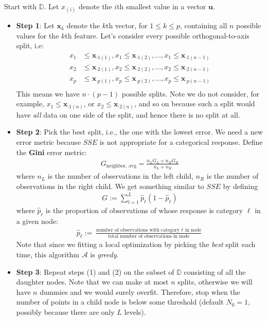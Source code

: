 \documentclass[12pt]{article}
\begin{document}
\begin{enumerate}
Start with $\mathbb{D}$. Let $x_{(i)}$ denote the $i$th smallest
value in a vector $\bm{u}$.
\begin{itemize}
	\item \textbf{Step 1}: Let $\bm{x}_k$ denote the $k$th vector, for $1\leq k\leq p$,
	containing all $n$ possible values for the $k$th feature.
	Let's consider every possible orthogonal-to-axis split, i.e:
	\begin{align*}
		x_1&\leq \bm{x}_{\cdot 1(1)}, x_1 \leq \bm{x}_{\cdot 1(2)}, \ldots, x_1 \leq \bm{x}_{\cdot 1(n-1)}\\
		x_2&\leq \bm{x}_{\cdot 2(1)}, x_2 \leq \bm{x}_{\cdot 2(2)}, \ldots, x_2 \leq \bm{x}_{\cdot 2(n-1)}\\
		x_p&\leq \bm{x}_{\cdot p(1)}, x_p \leq \bm{x}_{\cdot p(2)}, \ldots, x_p \leq \bm{x}_{\cdot p(n-1)}\\
	\end{align*}
	This means we have $n\cdot (p-1)$ possible splits. Note we do not
	consider, for example, $x_1\leq \bm{x}_{\cdot 1(n)}$,
	or $x_2\leq \bm{x}_{\cdot 2(n)}$, and so on because such a split
	would have \textit{all} data on one side of the split, and hence
	there is no split at all.
	\item \textbf{Step 2}: Pick the best split, i.e., the one with the lowest error.
	We need a new error metric because $SSE$ is not appropriate for
	a categorical response. Define the \textbf{Gini} error metric:
	\begin{align*}
		G_{\text{neighbor, avg}} = \frac{n_L G_L + n_R G_R}{n_L + n_R}
	\end{align*}
	where $n_L$ is the number of observations in the left child,
	$n_R$ is the number of observations in the right child.
	We get something similar to $SSE$ by defining
	\begin{align*}
		G := \sum_{l=1}^{L}\hat{p}_\ell(1 - \hat{p}_\ell)
	\end{align*}
	where $\hat{p}_\ell$ is the proportion of observations of whose response
	is category $\ell$ in a given node:
	\begin{align*}
		\hat{p}_\ell := \frac{
			\text{number of observations with category $\ell$ in node}}
		{\text{total number of observations in node}}
	\end{align*}
	Note that since we fitting a local optimization by picking
	the \textit{best} split each time, this algorithm $\mathcal{A}$ 
	is \textit{greedy}.
	\item \textbf{Step 3}: Repeat steps (1) and (2) on the subset of $\mathbb{D}$
	consisting of all the daughter nodes. Note that we can make
	at most $n$ splits, otherwise we will have $n$ dummies and we
	would surely overfit. Therefore, stop when the number of points
	in a child node is below some threshold (default $N_0=1$,
	possibly because there are only $L$ levels).
\end{itemize}



\end{enumerate}
\end{document}
